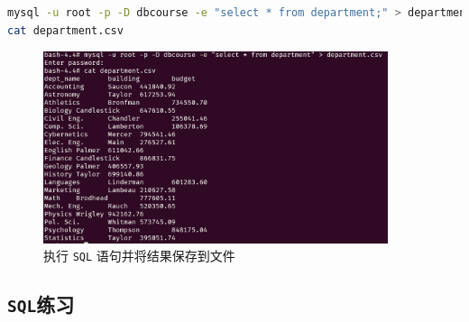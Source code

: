 \documentclass{article}
\begin{document}
\begin{lstlisting}[language=bash]
mysql -u root -p -D dbcourse -e "select * from department;" > department.csv
cat department.csv
\end{lstlisting}

\begin{figure}[H]
\centering
\includegraphics[width=0.9\textwidth]{img/6.png}
\caption{执行 \texttt{SQL} 语句并将结果保存到文件}
\end{figure}

\subsection{\texttt{SQL}练习}
\end{document}
